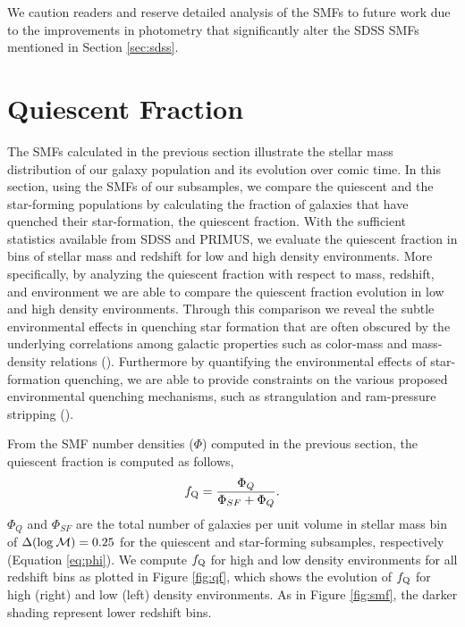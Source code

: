 \documentclass{emulateapj}
\begin{document}
We caution readers and reserve detailed analysis of the SMFs to future work due to the improvements in photometry that significantly alter the SDSS SMFs mentioned in Section \ref{sec:sdss}. 

\section{Quiescent Fraction} \label{sec:qf_const}
The SMFs calculated in the previous section illustrate the stellar mass distribution of our galaxy population and its evolution over comic time. In this section, using the SMFs of our subsamples, we compare the quiescent and the star-forming populations by calculating the fraction of galaxies that have quenched their star-formation, the quiescent fraction. With the sufficient statistics available from SDSS and PRIMUS, we evaluate the quiescent fraction in bins of stellar mass and redshift for low and high density environments. More specifically, by analyzing the quiescent fraction with respect to mass, redshift, and environment we are able to compare the quiescent fraction evolution in low and high density environments. Through this comparison we reveal the subtle environmental effects in quenching star formation that are often obscured by the underlying correlations among galactic properties such as color-mass and mass-density relations (\cite{Cooper:2010aa}). Furthermore by quantifying the environmental effects of star-formation quenching, we are able to provide constraints on the various proposed environmental quenching mechanisms, such as strangulation and ram-pressure stripping (\cite{McCarthy:2008aa}).

From the SMF number densities ($\Phi$) computed in the previous section, the quiescent fraction is computed as follows, 
\begin{equation}
f_{\rm{Q}} = \frac{\Phi_{Q}}{\Phi_{SF}+\Phi_{Q}}.
\end{equation}
$\Phi_{Q}$ and $\Phi_{SF}$ are the total number of galaxies per unit volume in stellar mass bin of $\Delta(\rm{log} \: \mathcal{M}) = 0.25$ for the quiescent and star-forming subsamples, respectively (Equation \ref{eq:phi}). We compute $f_{\rm{Q}}$ for high and low density environments for all redshift bins as plotted in Figure \ref{fig:qf}, which shows the evolution of $f_{\rm{Q}}$ for high (right) and low (left) density environments. As in Figure \ref{fig:smf}, the darker shading represent lower redshift bins. 
\end{document}
